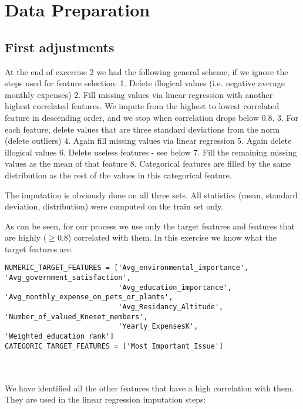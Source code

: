 \documentclass[12pt]{scrartcl}
\begin{document}
\section{Data Preparation}
\subsection{First adjustments}
At the end of excercise 2 we had the following general scheme, if we ignore the steps used for feature selection:
1. Delete illogical values (i.e. negative average monthly expenses)
2. Fill missing values via linear regression with another highest correlated features. We impute from the highest to lowest correlated feature in descending order, and we stop when correlation drops below 0.8.
3. For each feature, delete values that are three standard deviations from the norm (delete outliers)
4. Again fill missing values via linear regression
5. Again delete illogical values
6. Delete useless features - see below
7. Fill the remaining missing values as the mean of that feature
8. Categorical features are filled by the same distribution as the rest of the values in this categorical feature.

The imputation is obviously done on all three sets. All statistics (mean, standard deviation, distribution) were computed on the train set only.

As can be seen, for our process we use only the target features
and features that are highly ($\geq 0.8$) correlated with them. In this exercise we know what the target features are.\\

\begin{adjustbox}{max width=\linewidth}
\begin{lstlisting}
NUMERIC_TARGET_FEATURES = ['Avg_environmental_importance', 'Avg_government_satisfaction',
                           'Avg_education_importance', 'Avg_monthly_expense_on_pets_or_plants',
                           'Avg_Residancy_Altitude', 'Number_of_valued_Kneset_members',
                           'Yearly_ExpensesK', 'Weighted_education_rank']
CATEGORIC_TARGET_FEATURES = ['Most_Important_Issue']
\end{lstlisting}
\end{adjustbox}\\\\


We have identified all the other features that have a high correlation with them. They are used in the linear regression imputation steps:\\
\end{document}
